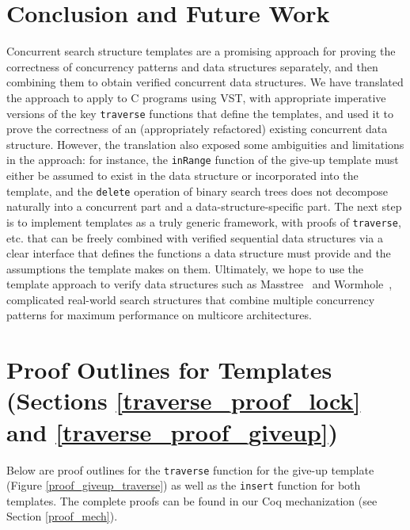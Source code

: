 \documentclass[sigplan,10pt,anonymous,review]{acmart}\settopmatter{printfolios=true,printccs=false,printacmref=false}
\newcommand{\wm}[1]{\textbf{\textcolor{violet}{[William: #1]}}}
\newcommand{\ignore}[1]{}
\begin{document}
\section{Conclusion and Future Work}
Concurrent search structure templates are a promising approach for proving the correctness of concurrency patterns and data structures separately, and then combining them to obtain verified concurrent data structures. We have translated the approach to apply to C programs using VST, with appropriate imperative versions of the key \lstinline{traverse} functions that define the templates, and used it to prove the correctness of an (appropriately refactored) existing concurrent data structure. However, the translation also exposed some ambiguities and limitations in the approach: for instance, the \lstinline{inRange} function of the give-up template must either be assumed to exist in the data structure or incorporated into the template, and the \lstinline{delete} operation of binary search trees does not decompose naturally into a concurrent part and a data-structure-specific part.  %
The next step is to implement templates as a truly generic framework, with proofs of \lstinline{traverse}, etc. that can be freely combined with verified sequential data structures via a clear interface that defines the functions a data structure must provide and the assumptions the template makes on them.
Ultimately, we hope to use the template approach to verify data structures such as Masstree~\cite{masstree} and Wormhole~\cite{wormhole}, complicated real-world search structures that combine multiple concurrency patterns for maximum performance on multicore architectures.


\ignore{
\begin{acks}
Thanks to Roshan Sharma, Alex Oey, and Anastasiia Evdokimova for extensive work on the original binary search tree implementation and verification.
\end{acks}
}






\appendix

\section{Proof Outlines for Templates (Sections \ref{traverse_proof_lock} and \ref{traverse_proof_giveup})}
\label{sec:apd_proof}
Below are proof outlines for the \texttt{traverse} function for the give-up template (Figure \ref{proof_giveup_traverse}) as well as the \texttt{insert} function for both templates. The complete proofs can be found in our Coq mechanization (see Section \ref{proof_mech}).
\end{document}
